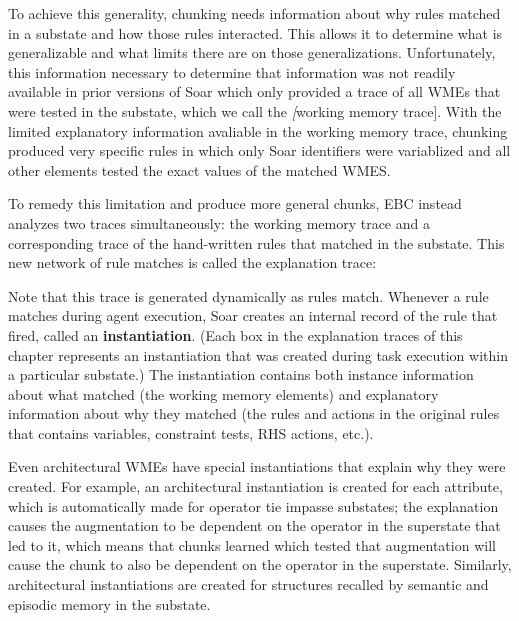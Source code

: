 To achieve this generality, chunking needs information about why rules matched in a substate and how those rules interacted.  This allows it to determine what is generalizable and what limits there are on those generalizations. Unfortunately, this information necessary to determine that information was not readily available in prior versions of Soar which only provided a trace of all WMEs that were tested in the substate, which we call the \textit[working memory trace].  With the limited explanatory information avaliable in the working memory trace, chunking produced very specific rules in which only Soar identifiers were variablized and all other elements tested the exact values of the matched WMES.  

To remedy this limitation and produce more general chunks, EBC instead analyzes two traces simultaneously:  the working memory trace and a corresponding trace of the hand-written rules that matched in the substate.  This new network of rule matches is called the explanation trace:

\vspace{12pt}
\begin{center}
	\captionsetup{type=figure}
	\centering{}
	\caption{A close-up of a trace showing differences between a working memory trace (left) vs an explanation trace (right).  The working memory trace only contains the literal values of the WMEs that matched.  The explanation trace, on the other hand, contains variables and various constraints on the values those variables can hold.}
	\label{fig:chunking-wm-vs-exp}
\end{center}

Note that this trace is generated dynamically as rules match.  Whenever a rule matches during agent execution, Soar creates an internal record of the rule that fired, called an \textbf{instantiation}.  (Each box in the explanation traces of this chapter represents an instantiation that was created during task execution within a particular substate.) The instantiation contains both instance information about what matched (the working memory elements) and explanatory information about why they matched (the rules and actions in the original rules that contains variables, constraint tests, RHS actions, etc.).  

Even architectural WMEs have special instantiations that explain why they were created.  For example, an architectural instantiation is created for each  attribute, which is automatically made for operator tie impasse substates; the explanation causes the  augmentation to be dependent on the operator in the superstate that led to it, which means that chunks learned which tested that  augmentation will cause the chunk to also be dependent on the operator in the superstate.  Similarly, architectural instantiations are created for structures recalled by semantic and episodic memory in the substate. 

